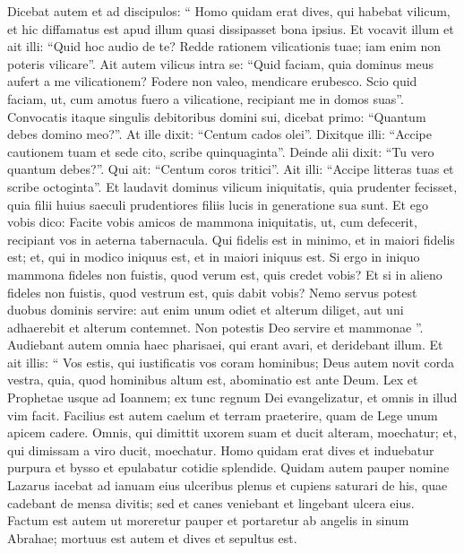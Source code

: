 \begin{biblechapter}
\begin{biblechapter}
\begin{biblechapter}
\begin{biblechapter}
\begin{biblechapter}
\begin{biblechapter}
\begin{biblechapter}
\begin{biblechapter}
\begin{biblechapter}
\begin{biblechapter}
\begin{biblechapter}
\begin{biblechapter}
\begin{biblechapter}
\begin{biblechapter}
\begin{biblechapter}
\begin{biblechapter}
\verse Dicebat autem et ad discipulos: “ Homo quidam erat dives, qui habebat vilicum, et hic diffamatus est apud illum quasi dissipasset bona ipsius. 
\verse Et vocavit illum et ait illi: “Quid hoc audio de te? Redde rationem vilicationis tuae; iam enim non poteris vilicare”. 
\verse Ait autem vilicus intra se: “Quid faciam, quia dominus meus aufert a me vilicationem? Fodere non valeo, mendicare erubesco. 
\verse Scio quid faciam, ut, cum amotus fuero a vilicatione, recipiant me in domos suas”. 
\verse Convocatis itaque singulis debitoribus domini sui, dicebat primo: “Quantum debes domino meo?”. 
\verse At ille dixit: “Centum cados olei”. Dixitque illi: “Accipe cautionem tuam et sede cito, scribe quinquaginta”. 
 \verse Deinde alii dixit: “Tu vero quantum debes?”. Qui ait: “Centum coros tritici”. Ait illi: “Accipe litteras tuas et scribe octoginta”. 
\verse Et laudavit dominus vilicum iniquitatis, quia prudenter fecisset, quia filii huius saeculi prudentiores filiis lucis in generatione sua sunt.
 \verse Et ego vobis dico: Facite vobis amicos de mammona iniquitatis, ut, cum defecerit, recipiant vos in aeterna tabernacula.
 \verse Qui fidelis est in minimo, et in maiori fidelis est; et, qui in modico iniquus est, et in maiori iniquus est.
 \verse Si ergo in iniquo mammona fideles non fuistis, quod verum est, quis credet vobis? 
\verse Et si in alieno fideles non fuistis, quod vestrum est, quis dabit vobis?
 \verse Nemo servus potest duobus dominis servire: aut enim unum odiet et alterum diliget, aut uni adhaerebit et alterum contemnet. Non potestis Deo servire et mammonae ”.
 \verse Audiebant autem omnia haec pharisaei, qui erant avari, et deridebant illum. 
\verse Et ait illis: “ Vos estis, qui iustificatis vos coram hominibus; Deus autem novit corda vestra, quia, quod hominibus altum est, abominatio est ante Deum.
 \verse Lex et Prophetae usque ad Ioannem; ex tunc regnum Dei evangelizatur, et omnis in illud vim facit.
 \verse Facilius est autem caelum et terram praeterire, quam de Lege unum apicem cadere.
 \verse Omnis, qui dimittit uxorem suam et ducit alteram, moechatur; et, qui dimissam a viro ducit, moechatur.
 \verse Homo quidam erat dives et induebatur purpura et bysso et epulabatur cotidie splendide. 
\verse Quidam autem pauper nomine Lazarus iacebat ad ianuam eius ulceribus plenus 
\verse et cupiens saturari de his, quae cadebant de mensa divitis; sed et canes veniebant et lingebant ulcera eius. 
\verse Factum est autem ut moreretur pauper et portaretur ab angelis in sinum Abrahae; mortuus est autem et dives et sepultus est. 

\end{biblechapter}
\end{biblechapter}
\end{biblechapter}
\end{biblechapter}
\end{biblechapter}
\end{biblechapter}
\end{biblechapter}
\end{biblechapter}
\end{biblechapter}
\end{biblechapter}
\end{biblechapter}
\end{biblechapter}
\end{biblechapter}
\end{biblechapter}
\end{biblechapter}
\end{biblechapter}
